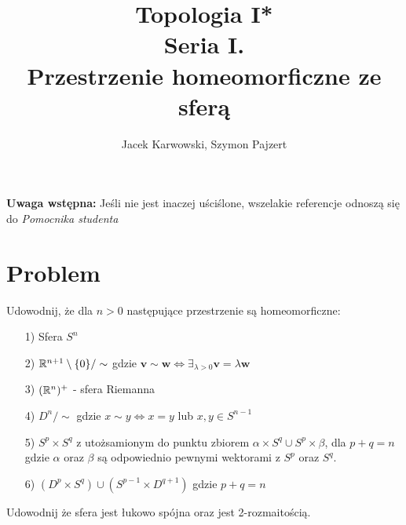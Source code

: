 \title{\textbf{Topologia I* \\ Seria I. \\ Przestrzenie homeomorficzne ze sferą}}
\date{}
\author{Jacek Karwowski, Szymon Pajzert}
\maketitle
\textbf{Uwaga wstępna:} Jeśli nie jest inaczej uściślone, wszelakie referencje odnoszą się do \emph{Pomocnika studenta} \cite{pomocnik}
\section*{Problem}
Udowodnij, że dla $n > 0$ następujące przestrzenie są homeomorficzne:
\begin{enumerate}
  \item[1)] Sfera $S^n$
  \item[2)] ${\mathbb{R}} ^ {n+1} \setminus \{ 0 \} / \sim $ gdzie $ \mathbf{v} \sim  \mathbf{w} \iff \exists_{\lambda > 0}  \mathbf{v}=  \lambda \mathbf{w} $
  \item[3)] $({\mathbb{R}}^n)^+$ - sfera Riemanna
  \item[4)] $D ^ {n} / \sim $ gdzie $ x \sim y \iff x = y $ lub $ x, y \in S^{n-1} $
  \item[5)] $S^p \times S^q$ z utożsamionym do punktu zbiorem $\alpha \times S^q \cup S^p \times \beta$, dla $p + q = n$ gdzie $\alpha$ oraz $\beta$ są odpowiednio pewnymi wektorami z $S^p$ oraz $S^q$.
  \item[6)] $(D^p \times S^q) \cup (S^{p-1} \times D^{q+1})$ gdzie $p+q = n$
\end{enumerate}
Udowodnij że sfera jest łukowo spójna oraz jest 2-rozmaitością.
